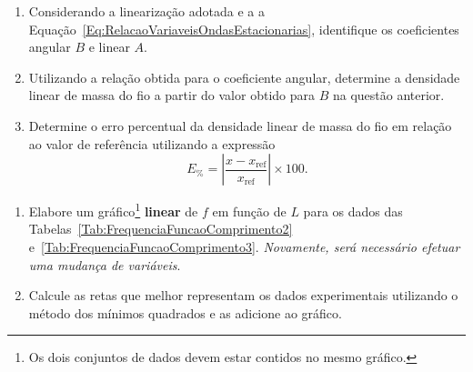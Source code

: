 \begin{question}[type={exam}]
\begin{enumerate}[label=\roman*.]
	\item Considerando a linearização adotada e a a Equação~\eqref{Eq:RelacaoVariaveisOndasEstacionarias}, identifique os coeficientes angular $B$ e linear $A$.
	\item Utilizando a relação obtida para o coeficiente angular, determine a densidade linear de massa do fio a partir do valor obtido para $B$ na questão anterior.
	\item Determine o erro percentual da densidade linear de massa do fio em relação ao valor de referência utilizando a expressão 
	\begin{equation}
		E_{\%} = \left|\frac{x-x_{\textrm{ref}}}{x_{\textrm{ref}}}\right| \times 100.
	\end{equation}
\end{enumerate}
\end{question}

\begin{question}[type={exam}]
\begin{enumerate}[label=\roman*.]
\item Elabore um gráfico\footnote{Os dois conjuntos de dados devem estar contidos no mesmo gráfico.} \textbf{linear} de $f$ em função de $L$ para os dados das Tabelas~\ref{Tab:FrequenciaFuncaoComprimento2} e~\ref{Tab:FrequenciaFuncaoComprimento3}. \emph{Novamente, será necessário efetuar uma mudança de variáveis}.
\item Calcule as retas que melhor representam os dados experimentais utilizando o método dos mínimos quadrados e as adicione ao gráfico.
\end{enumerate}
\end{question}


